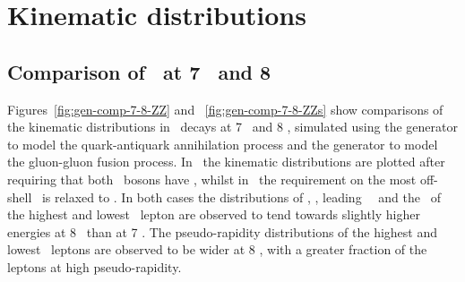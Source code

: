 \section{Kinematic distributions}

\subsection{Comparison of \ZZllll\ at 7 \tev\ and 8 \tev}

Figures~\ref{fig:gen-comp-7-8-ZZ} and ~\ref{fig:gen-comp-7-8-ZZs} show comparisons of the kinematic distributions in \ZZllll\
decays at 7 \tev\ and 8 \tev, simulated using the \powhegbox\cite{Melia:2011tj} generator
to model the quark-antiquark annihilation process and the \ggtwoZZ\cite{gg2ZZ} generator to
model the gluon-gluon fusion process. 
In~ the kinematic
distributions are plotted after requiring that both \Z\ bosons have \sstooos,
whilst in~\fig{gen-comp-7-8-ZZs} the requirement on the most off-shell \Z\ is
relaxed to \mZgtt. In both cases the distributions of \mZZ, \ptZZ, leading \Z\
\pt\ and the \pt\ of the highest and lowest \pt\ lepton are observed to tend towards
slightly higher energies at 8 \tev\ than at 7 \tev. The pseudo-rapidity
distributions of the highest and lowest \pt\ leptons are observed to be wider at
8 \tev, with a greater fraction of the leptons at high pseudo-rapidity.

